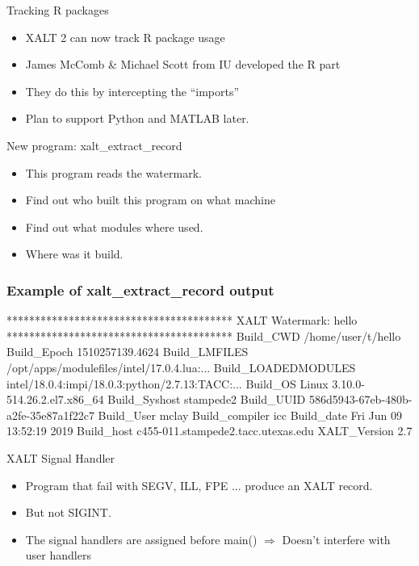 \documentclass{beamer}
\begin{document}
\begin{frame}{Tracking R packages}
  \begin{itemize}
    \item XALT 2 can now track R package usage
    \item James McComb \& Michael Scott from IU developed the R part
    \item They do this by intercepting the ``imports''
    \item Plan to support Python and MATLAB later.
  \end{itemize}
\end{frame}

\begin{frame}{New program: xalt\_extract\_record}
  \begin{itemize}
    \item This program reads the watermark.
    \item Find out who built this program on what machine
    \item Find out what modules where used.
    \item Where was it build. 
  \end{itemize}
\end{frame}

\begin{frame}[fragile]
    \frametitle{Example of xalt\_extract\_record output}
 {\small
    \begin{semiverbatim}
****************************************
XALT Watermark: hello
****************************************
Build\_CWD                /home/user/t/hello
Build\_Epoch              1510257139.4624
Build\_LMFILES            /opt/apps/modulefiles/intel/17.0.4.lua:...
Build\_LOADEDMODULES      intel/18.0.4:impi/18.0.3:python/2.7.13:TACC:...
Build\_OS                 Linux 3.10.0-514.26.2.el7.x86_64
Build\_Syshost            stampede2
Build\_UUID               586d5943-67eb-480b-a2fe-35e87a1f22c7
Build\_User               mclay
Build\_compiler           icc
Build\_date               Fri Jun 09 13:52:19 2019
Build\_host               c455-011.stampede2.tacc.utexas.edu
XALT\_Version             2.7
    \end{semiverbatim}
}
\end{frame}

\begin{frame}{XALT Signal Handler}
  \begin{itemize}
    \item Program that fail with SEGV, ILL, FPE ... produce an XALT record.
    \item But not SIGINT.
    \item The signal handlers are assigned before main() $\Rightarrow$
      Doesn't interfere with user handlers
  \end{itemize}
\end{frame}
\end{document}
